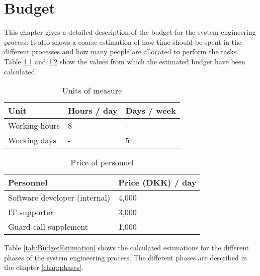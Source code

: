 \chapter{Budget}
This chapter gives a detailed description of the budget for the system engineering process.
It also shows a coarse estimation of how time should be spent in the different processes and how many people are allocated to perform the tasks.
\\

Table \ref{tab:UnitsOfMeasure} and \ref{tab:PriceOfPersonnel} show the values from which the estimated budget have been calculated.

\begin{table}[H]
\centering
\begin{tabular}{|l|ll|}
\hline
\textbf{Unit} & \textbf{Hours / day} & \textbf{Days / week} \\ \hline
Working hours & 8                    & -                    \\
Working days  & -                    & 5                    \\ \hline
\end{tabular}
\caption{Units of measure}
\label{tab:UnitsOfMeasure}
\end{table}

\begin{table}[H]
\centering
\begin{tabular}{|l|l|}
\hline
\textbf{Personnel}            & \textbf{Price (DKK) / day} \\ \hline
Software developer (internal) & 4,000                      \\
IT supporter                  & 3,000                      \\
Guard call supplement         & 1,000                      \\ \hline
\end{tabular}
\caption{Price of personnel}
\label{tab:PriceOfPersonnel}
\end{table}

Table \ref{tab:BudgetEstimation} shows the calculated estimations for the different phases of the system engineering process. The different phases are described in the chapter \ref{chap:phases}.

